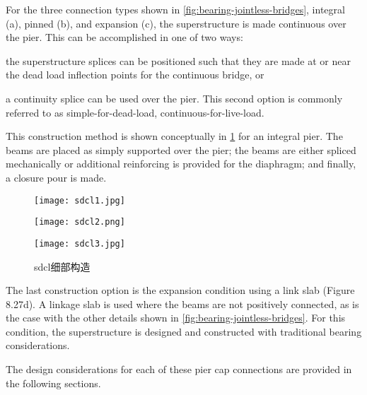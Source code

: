 For the three connection types shown in \cref{fig:bearing-jointless-bridges}, integral (a), pinned (b), and expansion (c), the superstructure
is made continuous over the pier. This can be accomplished in one of two ways: 
\begin{enumerate*}
  \item the superstructure splices can be positioned such that they are made at or near the dead load inflection points for the continuous bridge, or 
  \item a continuity splice can be used over the pier. This second option is commonly referred to as simple-for-dead-load, continuous-for-live-load. 
\end{enumerate*}
This construction method is shown conceptually in \cref{fig:sdcl-details} for an integral pier. The beams are placed as simply supported over the pier; the beams are either spliced mechanically or additional reinforcing is provided for the diaphragm; and finally, a closure pour is made.

\begin{figure}
  \begin{minipage}{0.32\linewidth}\centering
    \texttt{[image: sdcl1.jpg]}
  \end{minipage}%
  \begin{minipage}{0.33\linewidth}\centering
    \texttt{[image: sdcl2.png]}
  \end{minipage}%
  \begin{minipage}{0.35\linewidth}\centering
    \texttt{[image: sdcl3.jpg]}
  \end{minipage}
  \caption{\acrlong*{sdcl}细部构造}
  \label{fig:sdcl-details}
\end{figure}

The last construction option is the expansion condition using a link slab (Figure 8.27d). A linkage slab is used
where the beams are not positively connected, as is the case with the other details shown in \cref{fig:bearing-jointless-bridges}. For this
condition, the superstructure is designed and constructed with traditional bearing considerations.

The design considerations for each of these pier cap connections are provided in the following sections.


